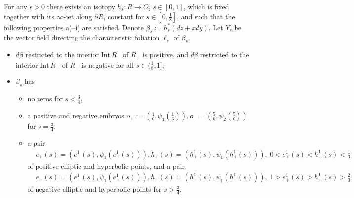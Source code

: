 \documentclass[10pt,a4paper]{amsart}
\newcommand{\Int}{\mathrm{Int\,}}
\newcommand{\eps}{\epsilon}
\newcommand{\p}{\partial}
\begin{document}
\begin{lemma}\label{lm:2d-plug} For any $  \eps>0$
there exists an      isotopy 
$h_s:R\to O$, $s\in[0,1] $, which is fixed together with its $\infty$-jet along $\p R$,   constant for $s\in[0,\frac18]$,  and such that the following properties  a)--i) are satisfied.
Denote $\beta_s:=h_s^* (dz + x dy)$. Let $Y_s$ be the vector field directing the characteristic foliation $\ell_s$ of $\beta_s$.  
\begin{itemize}
   \item[a)] $d\beta$ restricted to the interior $ \Int R_{+}$ of $R_ +$  is positive, and  $ d\beta$ restricted to the interior $\Int R_{-}$ of $R_-$ is negative
for all   $s\in(\frac18,1]$;
\item[b)] $\beta_s$ has
\begin{itemize}
\item no zeros    for $s<\frac34$,
\item  a positive and negative embryos $o_+:=(\frac16,\psi_1(\frac16)),
o_-=(\frac56,\psi_2(\frac56))$ for $s=\frac34$,
 \item a pair 
 \begin{align*}
 &e_+(s)=(e_+^1(s),\psi_1(e_+^1(s))), \hbar_+(s)=(\hbar_+^1(s),\psi_1(\hbar_+^1(s))),\; 0<e_+^1(s)<\hbar_+^1(s)<\frac13
 \end{align*} of positive elliptic and  hyperbolic   points, and a pair
 \begin{align*}
  &e_-(s)=(e_-^1(s),\psi_1(e_-^1(s))), \hbar_-(s)=(\hbar_-^1(s),\psi_1(\hbar_-^1(s))),\; 1>e_+^1(s)>\hbar_+^1(s)>\frac23
 \end{align*} of negative elliptic and  hyperbolic points for $s>\frac34$.
\end{itemize}
 

\end{itemize}
\end{lemma}
\end{document}
